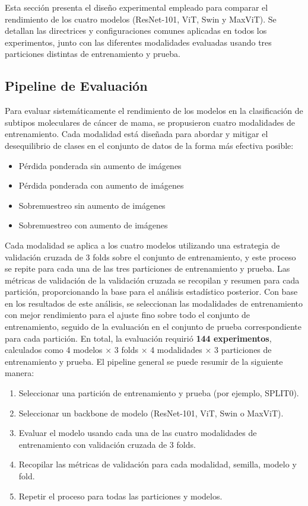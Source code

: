 \documentclass[a4paper,10pt]{book}
\begin{document}
Esta sección presenta el diseño experimental empleado para comparar el rendimiento de los cuatro modelos (ResNet-101, ViT, Swin y MaxViT). Se detallan las directrices y configuraciones comunes aplicadas en todos los experimentos, junto con las diferentes modalidades evaluadas usando tres particiones distintas de entrenamiento y prueba.

\subsection{Pipeline de Evaluación}

Para evaluar sistemáticamente el rendimiento de los modelos en la clasificación de subtipos moleculares de cáncer de mama, se propusieron cuatro modalidades de entrenamiento. Cada modalidad está diseñada para abordar y mitigar el desequilibrio de clases en el conjunto de datos de la forma más efectiva posible:

\begin{itemize}
\item Pérdida ponderada sin aumento de imágenes
\item Pérdida ponderada con aumento de imágenes
\item Sobremuestreo sin aumento de imágenes
\item Sobremuestreo con aumento de imágenes
\end{itemize}

Cada modalidad se aplica a los cuatro modelos utilizando una estrategia de validación cruzada de 3 folds sobre el conjunto de entrenamiento, y este proceso se repite para cada una de las tres particiones de entrenamiento y prueba. Las métricas de validación de la validación cruzada se recopilan y resumen para cada partición, proporcionando la base para el análisis estadístico posterior. Con base en los resultados de este análisis, se seleccionan las modalidades de entrenamiento con mejor rendimiento para el ajuste fino sobre todo el conjunto de entrenamiento, seguido de la evaluación en el conjunto de prueba correspondiente para cada partición. En total, la evaluación requirió \textbf{144 experimentos}, calculados como 4 modelos × 3 folds × 4 modalidades × 3 particiones de entrenamiento y prueba. El pipeline general se puede resumir de la siguiente manera:

\begin{enumerate}[label=\textbf{Paso \arabic*}:]
\item Seleccionar una partición de entrenamiento y prueba (por ejemplo, SPLIT0).
\item Seleccionar un backbone de modelo (ResNet-101, ViT, Swin o MaxViT).
\item Evaluar el modelo usando cada una de las cuatro modalidades de entrenamiento con validación cruzada de 3 folds.
\item Recopilar las métricas de validación para cada modalidad, semilla, modelo y fold.
\item Repetir el proceso para todas las particiones y modelos.
\end{enumerate}
\end{document}

